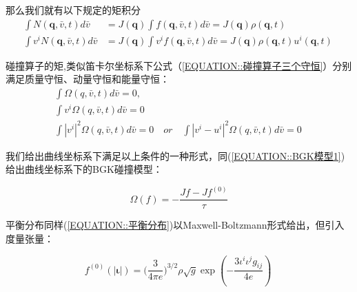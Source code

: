 \documentclass[LBMDerivation.tex]{subfiles}
\begin{document}
那么我们就有以下规定的矩积分
%
%
\begin{equation}
  \begin{aligned}
    \int N(\boldsymbol{q}, \bar{v}, t)   d \bar{v}     & =J(\boldsymbol{q}) \int f(\boldsymbol{q}, \bar{v}, t)d \bar{v} =J(\boldsymbol{q}) \rho(\boldsymbol{q}, t)                                \\
    \int v^{i} N(\boldsymbol{q}, \bar{v}, t) d \bar{v} & =J(\boldsymbol{q}) \int v^{i} f(\boldsymbol{q}, \bar{v}, t)d \bar{v} =J(\boldsymbol{q}) \rho(\boldsymbol{q}, t) u^{i}(\boldsymbol{q}, t)
  \end{aligned}
  \label{EQUATION::A.11} ~
\end{equation}
%
%

碰撞算子的矩,类似笛卡尔坐标系下公式（\ref{EQUATION::碰撞算子三个守恒}）分别满足质量守恒、动量守恒和能量守恒：
\begin{equation}
  \begin{aligned}
    \int  \Omega(q, \bar{v}, t)d \bar{v}=0,      \\
    \int  v^{i} \Omega(q, \bar{v}, t)d \bar{v}=0 \\
    \int|v^i|^2 \Omega(q, \bar{v}, t) d \bar{v} =0 \quad or \quad \int |v^i-u^i|^2 \Omega(q, \bar{v}, t) d \bar{v} =0
  \end{aligned}
  \label{EQUATION::碰撞特性} ~
\end{equation}
%

我们给出曲线坐标系下满足以上条件的一种形式，同(\ref{EQUATION::BGK模型1})给出曲线坐标系下的BGK碰撞模型：

\begin{equation}
  \boxed{
  \Omega(f)= -\frac{Jf-Jf^{(0)}}{\tau}
  }
\end{equation}


平衡分布同样(\ref{EQUATION::平衡分布})以Maxwell-Boltzmann形式给出，但引入度量张量：
%
%

\begin{equation}
  \boxed{
  f^{(0)}(| \boldsymbol{\iota}|) =  {(\frac{3}{4\pi e}})^{3/2}\rho \sqrt{g} \exp({-\frac{3 {\iota^i\iota^jg_{ij}}}{4e}})
  }
  \label{EQUATION::平衡分布2} ~
\end{equation}
\end{document}

